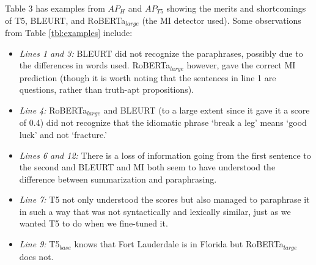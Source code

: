 Table 3 has examples from $AP_H$ and $AP_{T5}$ showing the merits and shortcomings of T5, BLEURT, and RoBERTa$_{large}$ (the MI detector used). Some observations from Table \ref{tbl:examples} include:
\begin{itemize}
    \item \textit{Lines 1 and 3:} BLEURT did not recognize the paraphrases, possibly due to the differences in words used. RoBERTa$_{large}$ however, gave the correct MI prediction (though it is worth noting that the sentences in line 1 are questions, rather than truth-apt propositions).
    \item \textit{Line 4:} RoBERTa$_{large}$ and BLEURT (to a large extent since it gave it a score of 0.4) did not recognize that the idiomatic phrase `break a leg' means `good luck' and not `fracture.'
    \item \textit{Lines 6 and 12:} There is a loss of information going from the first sentence to the second and BLEURT and MI both seem to have understood the difference between summarization and paraphrasing.
    \item \textit{Line 7:} T5 not only understood the scores but also managed to paraphrase it in such a way that was not syntactically and lexically similar, just as we wanted T5 to do when we fine-tuned it.
    \item \textit{Line 9:} T5$_{base}$ knows that Fort Lauderdale is in Florida but RoBERTa$_{large}$ does not.
\end{itemize}

%
